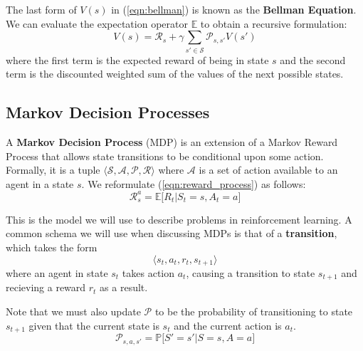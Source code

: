 \documentclass[journal, onecolumn, 12pt, draftclsnofoot]{IEEEtran}
\numberwithin{equation}{section}
\newcommand{\kword}[1]{\textbf{#1}}
\newcommand{\mc}[1]{\mathcal{#1}}
\begin{document}
	The last form of $V(s)$ in (\ref{eqn:bellman}) is known as the \kword{Bellman Equation}. We can evaluate the expectation operator $\mathbb{E}$ to obtain a recursive formulation:
	\begin{equation}
		\label{eqn:bellman-evaluated}
		V(s) = \mc{R}_s + \gamma \sum_{s' \in \mc{S}}\mc{P}_{s,s'} V(s')
	\end{equation}
	where the first term is the expected reward of being in state $s$ and the second term is the discounted weighted sum of the values of the next possible states.

	\subsection{Markov Decision Processes}
	\par A \kword{Markov Decision Process} (MDP) is an extension of a Markov Reward Process that allows state transitions to be conditional upon some action. Formally, it is a tuple $\langle \mc{S}, \mc{A}, \mc{P}, \mc{R} \rangle$ where $\mc{A}$ is a set of action available to an agent in a state $s$. We reformulate (\ref{eqn:reward_process}) as follows:
		\begin{equation}
			\label{eqn:decision_process}
			\mc{R}_s^a = \mathbb{E}\big[R_{t} \vert S_t = s, A_t = a \big]
		\end{equation}

		\par This is the model we will use to describe problems in reinforcement learning. A common schema we will use when discussing MDPs is that of a \kword{transition}, which takes the form
		$$\langle s_t, a_t, r_t, s_{t+1} \rangle$$
		where an agent in state $s_t$ takes action $a_t$, causing a transition to state $s_{t+1}$ and recieving a reward $r_t$ as a result.
		\par Note that we must also update $\mc{P}$ to be the probability of transitioning to state $s_{t+1}$ given that the current state is $s_t$ and the current action is $a_t$.
		\begin{equation}
			\label{eqn:state_transition_probability_MDP}
			\mc{P}_{s,a,s'} = \mathbb{P}\big[ S' = s' \vert S = s, A = a\big]
		\end{equation}
\end{document}
